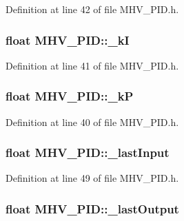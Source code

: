 \-Definition at line 42 of file \-M\-H\-V\-\_\-\-P\-I\-D.\-h.

\hypertarget{class_m_h_v___p_i_d_a47e47fe3d120325d9b12e205a274dcaa}{
\subsubsection[{\-\_\-k\-I}]{\setlength{\rightskip}{0pt plus 5cm}float {\bf \-M\-H\-V\-\_\-\-P\-I\-D\-::\-\_\-k\-I}}}
\label{class_m_h_v___p_i_d_a47e47fe3d120325d9b12e205a274dcaa}


\-Definition at line 41 of file \-M\-H\-V\-\_\-\-P\-I\-D.\-h.

\hypertarget{class_m_h_v___p_i_d_a2987b7582914a11ec39c38c2c2f8bb4f}{
\subsubsection[{\-\_\-k\-P}]{\setlength{\rightskip}{0pt plus 5cm}float {\bf \-M\-H\-V\-\_\-\-P\-I\-D\-::\-\_\-k\-P}}}
\label{class_m_h_v___p_i_d_a2987b7582914a11ec39c38c2c2f8bb4f}


\-Definition at line 40 of file \-M\-H\-V\-\_\-\-P\-I\-D.\-h.

\hypertarget{class_m_h_v___p_i_d_aa649c3528fb35b99ac6ce0dca338fcfb}{
\subsubsection[{\-\_\-last\-Input}]{\setlength{\rightskip}{0pt plus 5cm}float {\bf \-M\-H\-V\-\_\-\-P\-I\-D\-::\-\_\-last\-Input}}}
\label{class_m_h_v___p_i_d_aa649c3528fb35b99ac6ce0dca338fcfb}


\-Definition at line 49 of file \-M\-H\-V\-\_\-\-P\-I\-D.\-h.

\hypertarget{class_m_h_v___p_i_d_a8464b83c97658e1f78a0c927476af6de}{
\subsubsection[{\-\_\-last\-Output}]{\setlength{\rightskip}{0pt plus 5cm}float {\bf \-M\-H\-V\-\_\-\-P\-I\-D\-::\-\_\-last\-Output}}}
\label{class_m_h_v___p_i_d_a8464b83c97658e1f78a0c927476af6de}


